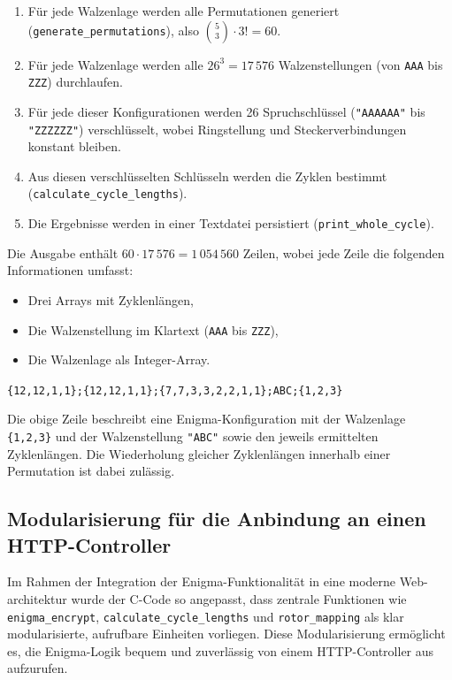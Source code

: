 \documentclass[12pt, ngerman, a4paper, numbers=noenddot]{article}
\begin{document}
\begin{enumerate}
	\item Für jede Walzenlage werden alle Permutationen generiert \newline(\lstinline|generate_permutations|), also \(\binom{5}{3} \cdot 3! = 60\).
	\item Für jede Walzenlage werden alle $26^3 = 17\,576$ Walzenstellungen (von \lstinline|AAA| bis \lstinline|ZZZ|) durchlaufen.
	\item Für jede dieser Konfigurationen werden 26 Spruchschlüssel (\lstinline|"AAAAAA"| bis \newline\lstinline|"ZZZZZZ"|) verschlüsselt, wobei Ringstellung und Steckerverbindungen konstant bleiben.
	\item Aus diesen verschlüsselten Schlüsseln werden die Zyklen bestimmt \newline(\lstinline|calculate_cycle_lengths|).
	\item Die Ergebnisse werden in einer Textdatei persistiert (\lstinline|print_whole_cycle|).
\end{enumerate}

Die Ausgabe enthält $60 \cdot 17\,576 = 1\,054\,560$ Zeilen, wobei jede Zeile die folgenden Informationen umfasst:

\begin{itemize}
	\item Drei Arrays mit Zyklenlängen,
	\item Die Walzenstellung im Klartext (\lstinline|AAA| bis \lstinline|ZZZ|),
	\item Die Walzenlage als Integer-Array.
\end{itemize}

\lstinline|{12,12,1,1};{12,12,1,1};{7,7,3,3,2,2,1,1};ABC;{1,2,3}|

Die obige Zeile beschreibt eine Enigma-Konfiguration mit der Walzenlage \lstinline|{1,2,3}| und der Walzenstellung \lstinline|"ABC"| sowie den jeweils ermittelten Zyklenlängen. Die Wiederholung gleicher Zyklenlängen innerhalb einer Permutation ist dabei zulässig.

\newpage

\subsection{Modularisierung für die Anbindung an einen HTTP-Controller}  
\label{subsec:c_api_prep}

Im Rahmen der Integration der Enigma-Funktionalität in eine moderne Web\hyp{}architektur wurde der C-Code so angepasst, dass zentrale Funktionen wie \lstinline|enigma_encrypt|, \lstinline|calculate_cycle_lengths| und \lstinline|rotor_mapping| als klar modularisierte, aufrufbare Einheiten vorliegen. Diese Modularisierung ermöglicht es, die Enigma-Logik bequem und zuverlässig von einem HTTP-Controller aus aufzurufen.
\end{document}
